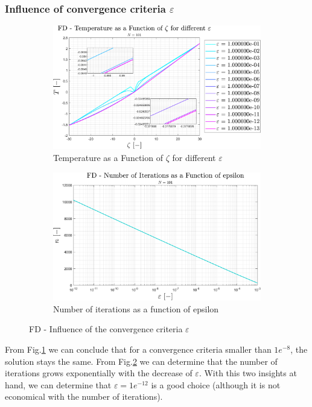 \documentclass[11pt, a4paper]{article}
\begin{document}
\subsubsection{Influence of convergence criteria $\varepsilon$}
\begin{figure}[H]
    \centering
    \begin{subfigure}[c]{0.49\textwidth}
        \centering
        \includegraphics[width=\textwidth]{images/FD - T vs zeta for diff epsilon.png}
        \caption{Temperature as a Function of $\zeta$ for different $\varepsilon$}
        \label{fig: FD - T vs zeta for diff epsilon}
    \end{subfigure}
    \hfill
    \begin{subfigure}[c]{0.49\textwidth}
        \centering
        \includegraphics[width=\textwidth]{images/FD - n vs epsilon.png}
        \caption{Number of iterations as a function of epsilon}
        \label{fig: FD - n vs epsilon}
    \end{subfigure}
    \caption{FD - Influence of the convergence criteria $\varepsilon$}
    \label{fig: FD - Influence of epsilon}
\end{figure}
From Fig.\ref{fig: FD - T vs zeta for diff epsilon} we can conclude that for a convergence criteria smaller than $1e^{-8}$, the solution stays the same. From Fig.\ref{fig: FD - n vs epsilon} we can determine that the number of iterations grows exponentially with the decrease of $\varepsilon$. With this two insights at hand, we can determine that $\varepsilon=1e^{-12}$ is a good choice (although it is not economical with the number of iterations).
\end{document}
